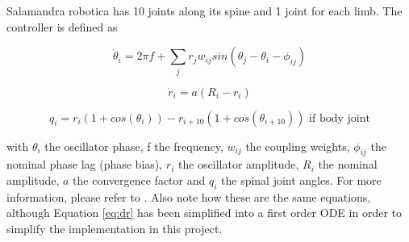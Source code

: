 \documentclass{cmc}
\begin{document}
Salamandra robotica has 10 joints along its spine and 1 joint for each
limb. The controller is defined as

\begin{equation}
  \label{eq:dphase}
  \dot{\theta}_i = 2 \pi f + \sum_j r_j w_{ij} sin(\theta_j - \theta_i - \phi_{ij})
\end{equation}

\begin{equation}
  \label{eq:dr}
  \dot{r}_i = a (R_i - r_i)
\end{equation}

\begin{equation}
  \label{eq:output}
  q_i = r_i(1 + cos(\theta_i)) - r_{i+10}(1 + cos(\theta_{i+10})) \text{ if body joint}
\end{equation}

with $ \theta_i $ the oscillator phase, f the frequency, $ w_{ij} $ the coupling
weights, $ \phi_{ij} $ the nominal phase lag (phase bias), $ r_i $ the
oscillator amplitude, $ R_i $ the nominal amplitude, $ a $ the convergence
factor and $ q_i $ the spinal joint angles. For more information, please refer
to \cite{ijspeert2007swimming}. Also note how these are the same equations,
although Equation \eqref{eq:dr} has been simplified into a first order ODE in
order to simplify the implementation in this project.
\end{document}

